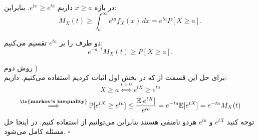 در بازه \(x \geq a\) داریم \(e^{tx} \geq e^{ta}\). بنابراین:
\[
M_X(t) \geq \int_a^\infty e^{ta} f_X(x) \, dx = e^{ta} P[X \geq a].
\]

دو طرف را بر \(e^{ta}\) تقسیم می‌کنیم:
\[
e^{-a \cdot t} M_X(t) \geq P[X \geq a].
\]

روش دوم )\\
برای حل این قسمت از  که در بخش اول اثبات کردیم استفاده می‌کنیم. داریم:
\[
	X \geq a \overset{t>0}{\Longleftrightarrow} e^{tX} \geq e^{ta}
\]
\[
	\overset{\textbf{\lr{markov's inequality}}}{\Longrightarrow} \mathbb{P}[e^{tX} \geq e^{ta}] \leq \frac{\mathbb{E}[e^{tX}]}{e^{ta}} = e^{-ta}\mathbb{E}[e^{tX}] = e^{-ta}M_X(t)
\]
توجه کنید $e^{tX}$ و $e^{ta}$ هردو نامنفی هستند بنابراین می‌توانیم از  استفاده کنیم. در اینجا حل مسئله کامل می‌شود. $\square$